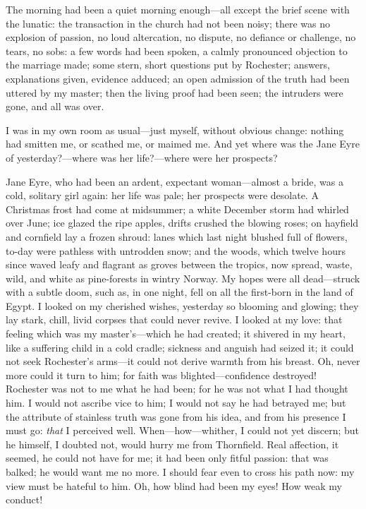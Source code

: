 The morning had been a quiet morning enough---all except the brief scene
with the lunatic: the transaction in the church had not been noisy;
there was no explosion of passion, no loud altercation, no dispute, no
defiance or challenge, no tears, no sobs: a few words had been spoken, a
calmly pronounced objection to the marriage made; some stern, short
questions put by \Mr{} Rochester; answers, explanations given, evidence
adduced; an open admission of the truth had been uttered by my master;
then the living proof had been seen; the intruders were gone, and all
was over.

I was in my own room as usual---just myself, without obvious change:
nothing had smitten me, or scathed me, or maimed me. And yet where was
the Jane Eyre of yesterday?---where was her life?---where were her
prospects?

Jane Eyre, who had been an ardent, expectant woman---almost a bride, was
a cold, solitary girl again: her life was pale; her prospects were
desolate. A Christmas frost had come at midsummer; a white December
storm had whirled over June; ice glazed the ripe apples, drifts crushed
the blowing roses; on hayfield and cornfield lay a frozen shroud: lanes
which last night blushed full of flowers, to-day were pathless with
untrodden snow; and the woods, which twelve hours since waved leafy and
flagrant as groves between the tropics, now spread, waste, wild, and
white as pine-forests in wintry Norway. My hopes were all dead---struck
with a subtle doom, such as, in one night, fell on all the first-born in
the land of Egypt. I looked on my cherished wishes, yesterday so
blooming and glowing; they lay stark, chill, livid corpses that could
never revive. I looked at my love: that feeling which was my
master's---which he had created; it shivered in my heart, like a
suffering child in a cold cradle; sickness and anguish had seized it; it
could not seek \Mr{} Rochester's arms---it could not derive warmth from
his breast. Oh, never more could it turn to him; for faith was
blighted---confidence destroyed! \Mr{} Rochester was not to me what he
had been; for he was not what I had thought him. I would not ascribe
vice to him; I would not say he had betrayed me; but the attribute of
stainless truth was gone from his idea, and from his presence I must go:
\emph{that} I perceived well. When---how---whither, I could not yet
discern; but he himself, I doubted not, would hurry me from Thornfield. 
Real affection, it seemed, he could not have for me; it had been only
fitful passion: that was balked; he would want me no more. I should
fear even to cross his path now: my view must be hateful to him. Oh,
how blind had been my eyes! How weak my conduct!

